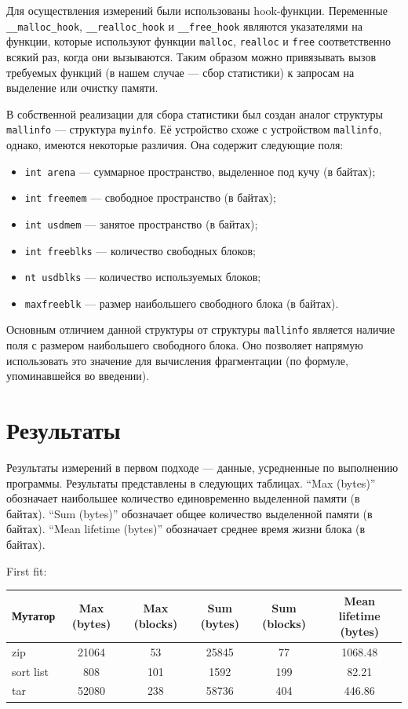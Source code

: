 Для осуществления измерений были использованы hook-функции. Переменные \texttt{\_\_malloc\_hook}, \texttt{\_\_realloc\_hook} 
и \texttt{\_\_free\_hook} являются указателями на функции, которые используют функции \texttt{malloc}, \texttt{realloc} и \texttt{free} 
соответственно всякий раз, когда они вызываются. Таким образом можно привязывать вызов требуемых функций (в нашем случае --- 
сбор статистики) к запросам на выделение или очистку памяти.
   
В собственной реализации для сбора статистики был создан аналог структуры \texttt{mallinfo} --- структура \texttt{myinfo}.
Её устройство схоже с устройством \texttt{mallinfo}, однако, имеются некоторые различия. Она содержит следующие поля:

\begin{itemize}
\item \texttt{int arena} --- суммарное пространство, выделенное под кучу (в байтах);
\item \texttt{int freemem} --- свободное пространство (в байтах);
\item \texttt{int usdmem} --- занятое пространство (в байтах);
\item \texttt{int freeblks} --- количество свободных блоков;
\item \texttt{nt usdblks} --- количество используемых блоков;
\item \texttt{maxfreeblk} --- размер наибольшего свободного блока (в байтах).
\end{itemize} 
   
Основным отличием данной структуры от структуры \texttt{mallinfo} является наличие поля с размером наибольшего свободного
блока. Оно позволяет напрямую использовать это значение для вычисления фрагментации (по формуле, упоминавшейся
во введении).
   
   
\section{Результаты}
   
Результаты измерений в первом подходе --- данные, усредненные по выполнению программы. Результаты представлены в следующих 
таблицах. ``Max (bytes)'' обозначает наибольшее количество единовременно выделенной памяти (в байтах). ``Sum (bytes)''
 обозначает общее количество выделенной памяти (в байтах). ``Mean lifetime (bytes)'' обозначает среднее время жизни блока
(в байтах).
    
    First fit:

    \begin{center}
    \begin{tabular}{| l | c | c | c | c | c |}
    \hline
    Мутатор & Max (bytes) & Max (blocks) & Sum (bytes) & Sum (blocks) & Mean lifetime (bytes)\\
    \hline
    zip & 21064 & 53 & 25845 & 77 & 1068.48\\
    \hline
    sort list & 808 & 101 & 1592 & 199 & 82.21 \\
    \hline
    tar & 52080 & 238 & 58736 & 404 & 446.86 \\
    \hline
    \end{tabular}
    \end{center}

